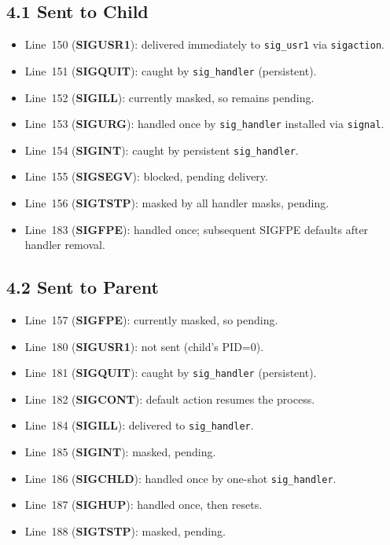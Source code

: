 \documentclass[12pt]{article}
\begin{document}
	\subsection*{4.1 Sent to Child}
	\begin{itemize}
		\item Line 150 (\textbf{SIGUSR1}): delivered immediately to \texttt{sig\_usr1} via \texttt{sigaction}.
		\item Line 151 (\textbf{SIGQUIT}): caught by \texttt{sig\_handler} (persistent).
		\item Line 152 (\textbf{SIGILL}): currently masked, so remains pending.
		\item Line 153 (\textbf{SIGURG}): handled once by \texttt{sig\_handler} installed via \texttt{signal}.
		\item Line 154 (\textbf{SIGINT}): caught by persistent \texttt{sig\_handler}.
		\item Line 155 (\textbf{SIGSEGV}): blocked, pending delivery.
		\item Line 156 (\textbf{SIGTSTP}): masked by all handler masks, pending.
		\item Line 183 (\textbf{SIGFPE}): handled once; subsequent SIGFPE defaults after handler removal.
	\end{itemize}
	
	\subsection*{4.2 Sent to Parent}
	\begin{itemize}
		\item Line 157 (\textbf{SIGFPE}): currently masked, so pending.
		\item Line 180 (\textbf{SIGUSR1}): not sent (child’s PID=0).
		\item Line 181 (\textbf{SIGQUIT}): caught by \texttt{sig\_handler} (persistent).
		\item Line 182 (\textbf{SIGCONT}): default action resumes the process.
		\item Line 184 (\textbf{SIGILL}): delivered to \texttt{sig\_handler}.
		\item Line 185 (\textbf{SIGINT}): masked, pending.
		\item Line 186 (\textbf{SIGCHLD}): handled once by one-shot \texttt{sig\_handler}.
		\item Line 187 (\textbf{SIGHUP}): handled once, then resets.
		\item Line 188 (\textbf{SIGTSTP}): masked, pending.
	\end{itemize}
	
\end{document}
